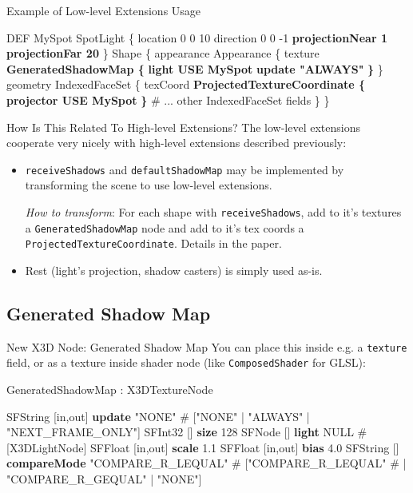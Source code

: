 \documentclass{beamer}
\newcommand*{\codeem}[1]{\textbf{#1}}
\begin{document}
\begin{frame}[fragile]{Example of Low-level Extensions Usage}
\begin{semiverbatim}
DEF MySpot SpotLight \{
  location 0 0 10    direction 0 0 -1
  \codeem{projectionNear 1}    \codeem{projectionFar 20}  \}
Shape \{
  appearance Appearance \{
    texture \codeem{GeneratedShadowMap \{}
      \codeem{light USE MySpot}    \codeem{update "ALWAYS"} \codeem{\}} \}
  geometry IndexedFaceSet \{
    texCoord \codeem{ProjectedTextureCoordinate \{}
      \codeem{projector USE MySpot} \codeem{\}}
    \# ... other IndexedFaceSet fields
  \} \}
\end{semiverbatim}
\end{frame}

\begin{frame}{How Is This Related To High-level Extensions?}
  \alert{The low-level extensions cooperate very nicely with high-level
  extensions described previously:}

  \begin{itemize}
    \item \texttt{receiveShadows} and \texttt{defaultShadowMap}
      may be implemented by transforming the scene to use low-level extensions.

      \textit{How to transform}:
      For each shape with \texttt{receiveShadows}, add to it's textures
      a \texttt{GeneratedShadowMap} node and add to it's tex coords
      a \texttt{ProjectedTextureCoordinate}. Details in the paper.

    \item Rest (light's projection, shadow casters) is simply used as-is.
  \end{itemize}
\end{frame}

\subsection{Generated Shadow Map}

\begin{frame}[fragile]{New X3D Node: Generated Shadow Map}
  You can place this inside e.g. a \texttt{texture} field,
  or as a texture inside shader node (like \texttt{ComposedShader} for GLSL):

\begin{block}{GeneratedShadowMap : X3DTextureNode}
\begin{semiverbatim}
SFString  [in,out]  \codeem{update} "NONE"
  \# ["NONE" | "ALWAYS" | "NEXT\_FRAME\_ONLY"]
SFInt32   []        \codeem{size}  128
SFNode    []        \codeem{light} NULL \# [X3DLightNode]
SFFloat   [in,out]  \codeem{scale} 1.1
SFFloat   [in,out]  \codeem{bias}  4.0
SFString  []        \codeem{compareMode}
  "COMPARE\_R\_LEQUAL" \# ["COMPARE\_R\_LEQUAL"
  \# | "COMPARE\_R\_GEQUAL" | "NONE"]
\end{semiverbatim}
\end{block}
\end{frame}
\end{document}
